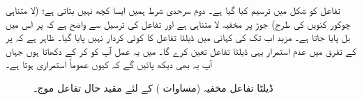 تفاعل  کو شکل  میں ترسیم کیا گیا ہے۔ دوم سرحدی شرط ہمیں ایسا کچھ نہیں بتاتی ہے؛ (لا متناہی چوکور کنویں  کی طرح) جوڑ پر مخفیہ لا متناہی ہے اور تفاعل کی ترسیل سے واضح ہے کہ  پر اس میں بل پایا جاتا ہے۔ مزید اب تک کی کہانی میں ڈیلٹا تفاعل کا کوئی کردار نہیں پایا گیا۔ ظاہر ہے کہ  پر  کے تفرق میں عدم استمرار یہی ڈیلٹا تفاعل تعین کرے گا۔ میں یہ عمل آپ کو کر کے دکھاتا ہوں جہاں آپ یہ بھی دیکھ پائیں گے کہ کیوں  عموماً استمراری ہوتا ہے۔ 

\begin{figure}
\centering
{}
\caption{ڈیلٹا تفاعل مخفیہ (مساوات ) کے لئے مقید حال تفاعل موج۔}
\label{شکل_غیر_تابع_مقید_حال_تفاعل_موج}
\end{figure}

